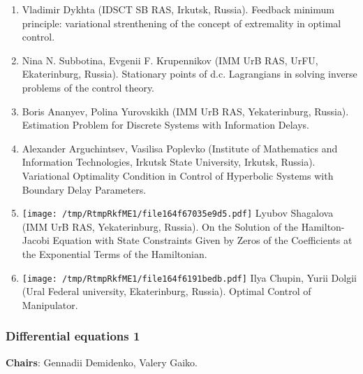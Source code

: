 \documentclass[
]{article}
\providecommand{\tightlist}{%
  \setlength{\itemsep}{0pt}\setlength{\parskip}{0pt}}
\begin{document}
\begin{enumerate}
\def\labelenumi{\arabic{enumi}.}
\tightlist
\item
  Vladimir Dykhta (IDSCT SB RAS, Irkutsk, Russia). Feedback minimum
  principle: variational strenthening of the concept of extremality in
  optimal control.
\item
  Nina N. Subbotina, Evgenii F. Krupennikov (IMM UrB RAS, UrFU,
  Ekaterinburg, Russia). Stationary points of d.c. Lagrangians in
  solving inverse problems of the control theory.
\item
  Boris Ananyev, Polina Yurovskikh (IMM UrB RAS, Yekaterinburg, Russia).
  Estimation Problem for Discrete Systems with Information Delays.
\item
  Alexander Arguchintsev, Vasilisa Poplevko (Institute of Mathematics
  and Information Technologies, Irkutsk State University, Irkutsk,
  Russia). Variational Optimality Condition in Control of Hyperbolic
  Systems with Boundary Delay Parameters.
\item
  \protect\texttt{[image: /tmp/RtmpRkfME1/file164f67035e9d5.pdf]}
  Lyubov Shagalova (IMM UrB RAS, Yekaterinburg, Russia). On the Solution
  of the Hamilton-Jacobi Equation with State Constraints Given by Zeros
  of the Coefficients at the Exponential Terms of the Hamiltonian.
\item
  \protect\texttt{[image: /tmp/RtmpRkfME1/file164f6191bedb.pdf]}
  Ilya Chupin, Yurii Dolgii (Ural Federal university, Ekaterinburg,
  Russia). Optimal Control of Manipulator.
\end{enumerate}

\hypertarget{de1}{%
\subsubsection{Differential equations 1}\label{de1}}

\textbf{Chairs}: Gennadii Demidenko, Valery Gaiko.
\end{document}
